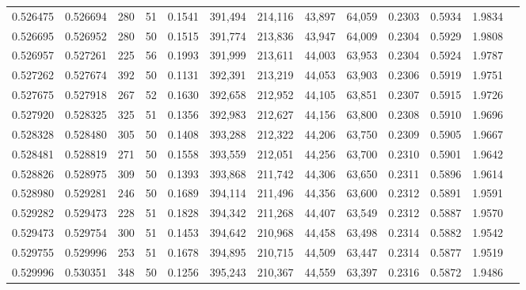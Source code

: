 \begin{tabular}{rrrrrrrrrrrrr}
0.526475 & 0.526694 &   280 &  51 &                                     0.1541 & 391,494 & 214,116 &  43,897 &  64,059 & 0.2303 & 0.5934 & 1.9834 \\
0.526695 & 0.526952 &   280 &  50 &                                     0.1515 & 391,774 & 213,836 &  43,947 &  64,009 & 0.2304 & 0.5929 & 1.9808 \\
0.526957 & 0.527261 &   225 &  56 &                                     0.1993 & 391,999 & 213,611 &  44,003 &  63,953 & 0.2304 & 0.5924 & 1.9787 \\
0.527262 & 0.527674 &   392 &  50 &                                     0.1131 & 392,391 & 213,219 &  44,053 &  63,903 & 0.2306 & 0.5919 & 1.9751 \\
0.527675 & 0.527918 &   267 &  52 &                                     0.1630 & 392,658 & 212,952 &  44,105 &  63,851 & 0.2307 & 0.5915 & 1.9726 \\
0.527920 & 0.528325 &   325 &  51 &                                     0.1356 & 392,983 & 212,627 &  44,156 &  63,800 & 0.2308 & 0.5910 & 1.9696 \\
0.528328 & 0.528480 &   305 &  50 &                                     0.1408 & 393,288 & 212,322 &  44,206 &  63,750 & 0.2309 & 0.5905 & 1.9667 \\
0.528481 & 0.528819 &   271 &  50 &                                     0.1558 & 393,559 & 212,051 &  44,256 &  63,700 & 0.2310 & 0.5901 & 1.9642 \\
0.528826 & 0.528975 &   309 &  50 &                                     0.1393 & 393,868 & 211,742 &  44,306 &  63,650 & 0.2311 & 0.5896 & 1.9614 \\
0.528980 & 0.529281 &   246 &  50 &                                     0.1689 & 394,114 & 211,496 &  44,356 &  63,600 & 0.2312 & 0.5891 & 1.9591 \\
0.529282 & 0.529473 &   228 &  51 &                                     0.1828 & 394,342 & 211,268 &  44,407 &  63,549 & 0.2312 & 0.5887 & 1.9570 \\
0.529473 & 0.529754 &   300 &  51 &                                     0.1453 & 394,642 & 210,968 &  44,458 &  63,498 & 0.2314 & 0.5882 & 1.9542 \\
0.529755 & 0.529996 &   253 &  51 &                                     0.1678 & 394,895 & 210,715 &  44,509 &  63,447 & 0.2314 & 0.5877 & 1.9519 \\
0.529996 & 0.530351 &   348 &  50 &                                     0.1256 & 395,243 & 210,367 &  44,559 &  63,397 & 0.2316 & 0.5872 & 1.9486 \\

\end{tabular}
